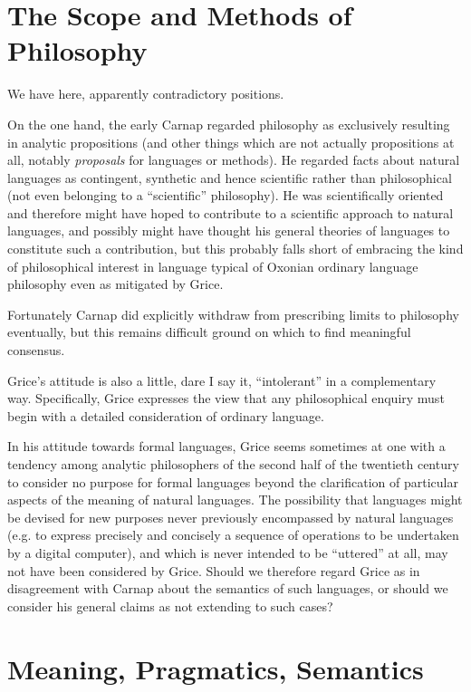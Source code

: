 \documentclass[10pt,titlepage]{book}
\begin{document}
\section{The Scope and Methods of Philosophy}

We have here, apparently contradictory positions.

On the one hand, the early Carnap regarded philosophy as exclusively resulting in analytic propositions (and other things which are not actually propositions at all, notably {\it proposals} for languages or methods).
He regarded facts about natural languages as contingent, synthetic and hence scientific rather than philosophical (not even belonging to a ``scientific'' philosophy).
He was scientifically oriented and therefore might have hoped to contribute to a scientific approach to natural languages, and possibly might have thought his general theories of languages to constitute such a contribution, but this probably falls short of embracing the kind of philosophical interest in language typical of Oxonian ordinary language philosophy even as mitigated by Grice.

Fortunately Carnap did explicitly withdraw from prescribing limits to philosophy eventually, but this remains difficult ground on which to find meaningful consensus.

Grice's attitude is also a little, dare I say it, ``intolerant'' in a complementary way.
Specifically, Grice expresses the view that any philosophical enquiry must begin with a detailed consideration of ordinary language.

In his attitude towards formal languages, Grice seems sometimes at one with a tendency among analytic philosophers of the second half of the twentieth century to consider no purpose for formal languages beyond the clarification of particular aspects of the meaning of natural languages.
The possibility that languages might be devised for new purposes never previously encompassed by natural languages (e.g. to express precisely and concisely a sequence of operations to be undertaken by a digital computer), and which is never intended to be ``uttered'' at all, may not have been considered by Grice.
Should we therefore regard Grice as in disagreement with Carnap about the semantics of such languages, or should we consider his general claims as not extending to such cases?

\section{Meaning, Pragmatics, Semantics}
\end{document}

